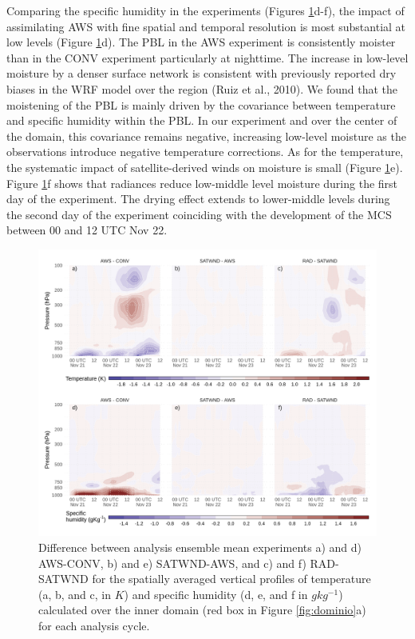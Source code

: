 \documentclass[authoryear,preprint,review,12pt]{elsarticle} %
\begin{document}
Comparing the specific humidity in the experiments (Figures \ref{fig:TQ-diff}d-f), the impact of assimilating AWS with fine spatial and temporal resolution is most substantial at low levels (Figure \ref{fig:TQ-diff}d). The PBL in the AWS experiment is consistently moister than in the CONV experiment particularly at nighttime. The increase in low-level moisture by a denser surface network is consistent with previously reported dry biases in the WRF model over the region (Ruiz et al., 2010). We found that the moistening of the PBL is mainly driven by the covariance between temperature and specific humidity within the PBL. In our experiment and over the center of the domain, this covariance remains negative, increasing low-level moisture as the observations introduce negative temperature corrections. As for the temperature, the systematic impact of satellite-derived winds on moisture is small (Figure \ref{fig:TQ-diff}e). Figure \ref{fig:TQ-diff}f shows that radiances reduce low-middle level moisture during the first day of the experiment. The drying effect extends to lower-middle levels during the second day of the experiment coinciding with the development of the MCS between 00 and 12 UTC Nov 22.



\begin{figure}[th]

{\centering \includegraphics{../figures/TQ-diff-1} 

}

\caption{Difference between analysis ensemble mean experiments a) and d) AWS-CONV, b) and e) SATWND-AWS, and c) and f) RAD-SATWND for the spatially averaged vertical profiles of temperature (a, b, and c, in \(K\)) and specific humidity (d, e, and f in \(gkg^{-1}\)) calculated over the inner domain (red box in Figure \ref{fig:dominio}a) for each analysis cycle.}\label{fig:TQ-diff}
\end{figure}
\end{document}
